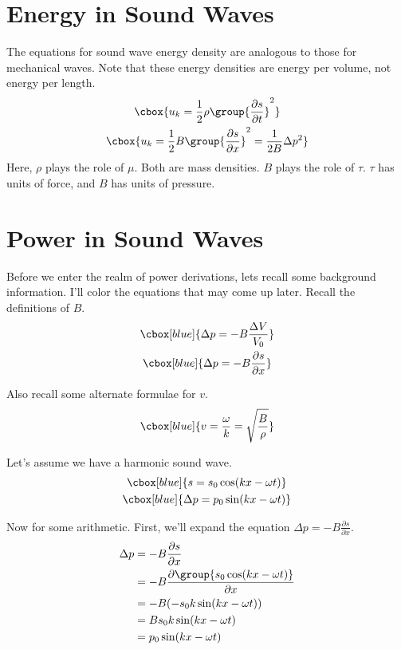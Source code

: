 \documentclass{hw}
\numberwithin{equation}{section}
\begin{document}
\section{Energy in Sound Waves}
The equations for sound wave energy density are analogous to those for
mechanical waves. Note that these energy densities are energy per volume, not
energy per length.
\begin{gather}
  \cbox{u_k = \frac{1}{2} \rho \group{\frac{\partial s}{\partial t}}^2} \\
  \cbox{u_k = \frac{1}{2} B    \group{\frac{\partial s}{\partial x}}^2
            = \frac{1}{2B} \Delta p^2}
\end{gather}
Here, $\rho$ plays the role of $\mu$. Both are mass densities. $B$ plays the
role of $\tau$. $\tau$ has units of force, and $B$ has units of pressure.

\section{Power in Sound Waves}
Before we enter the realm of power derivations, lets recall some background
information. I'll color the equations that may come up later. Recall the
definitions of $B$.
\begin{gather}
  \cbox[blue]{\Delta p = -B \frac{\Delta V}{V_0}} \\
  \cbox[blue]{\Delta p = -B \frac{\partial s}{\partial x}}
\end{gather}

Also recall some alternate formulae for $v$.
\begin{equation}
  \cbox[blue]{v = \frac{\omega}{k} = \sqrt{\frac{B}{\rho}}}
\end{equation}

Let's assume we have a harmonic sound wave.
\begin{gather}
  \cbox[blue]{s        = s_0 \cos(kx - \omega t)} \\
  \cbox[blue]{\Delta p = p_0 \sin(kx - \omega t)}
\end{gather}

Now for some arithmetic. First, we'll expand the equation $\Delta p = -B
\frac{\partial s}{\partial x}$.
\begin{align}
  \Delta p &= -B \frac{\partial s}{\partial x}                               \\
           &= -B \frac{\partial \group{s_0 \cos(kx - \omega t)}}{\partial x} \\
           &= -B (-s_0 k \sin(kx - \omega t))                                \\
           &= B s_0 k \sin(kx - \omega t)                                    \\
           &= p_0     \sin(kx - \omega t)                                    
\end{align}
\end{document}
